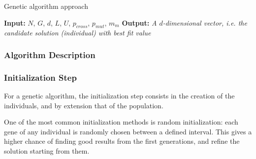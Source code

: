 \begin{algorithm}
	\caption{Genetic algorithm approach} \label{alg:ga}
	\begin{algorithmic}
		\newline
		\textbf{Input:} $N$, $G$, $d$, $L$, $U$, $p_{cross}$, $p_{mut}$, $m_m$\newline
		\textbf{Output:} \textit{A $d$-dimensional vector, i.e. the candidate solution (individual) with best fit value}
					\EndIf
				\EndFor
			\EndFor
		\EndProcedure
	\end{algorithmic}	
\end{algorithm}

\subsubsection{Algorithm Description}

\label{sec:5.steps}
\subsubsection{Initialization Step}

For a genetic algorithm, the initialization step consists in the creation
of the individuals, and by extension that of the population.

One of the most common initialization methods is random initialization:
each gene of any individual is randomly chosen between a defined interval.
This gives a higher chance of finding good results from the first generations,
and refine the solution starting from them.

